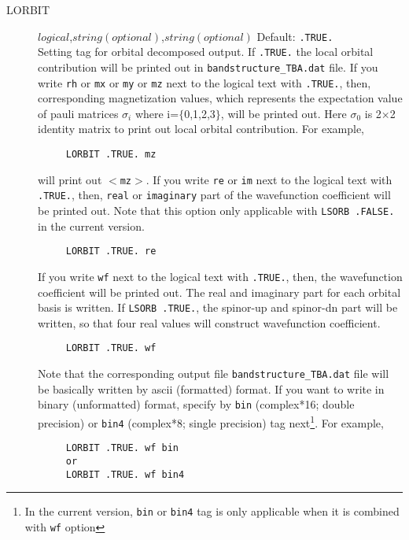 \documentclass[a4paper,12pt]{scrartcl}
\makeatletter
\def\namedlabel#1#2{\begingroup
    #2%
    \def\@currentlabel{#2}%
    \phantomsection\label{#1}\endgroup
}
\makeatother
\begin{document}
\begin{description}
    \item[\namedlabel{tag:LORBIT}{LORBIT}] $logical$,$string (optional)$,$string (optional)$ Default: \texttt{.TRUE.} \\
        Setting tag for orbital decomposed output.
		If \texttt{.TRUE.} the local orbital contribution will be printed out
		in \texttt{bandstructure\_TBA.dat} file.
        If you write \texttt{rh} or \texttt{mx} or \texttt{my} or \texttt{mz} next to the logical text with \texttt{.TRUE.},
        then, corresponding magnetization values, which represents
        the expectation value of pauli matrices $\sigma_{i}$ where i=$\{$0,1,2,3$\}$, 
        will be printed out. Here $\sigma_{0}$ is 2$\times$2 identity 
        matrix to print out local orbital contribution. For example,   
        
    \begin{verbatim}
     LORBIT .TRUE. mz
    \end{verbatim}
    will print out $<$\texttt{mz}$>$.
        If you write \texttt{re} or \texttt{im} next to the logical text with \texttt{.TRUE.}, then, \texttt{real} or \texttt{imaginary} part of the wavefunction coefficient will be printed out. Note that this option only applicable with \texttt{LSORB .FALSE.} in the current version.
    \begin{verbatim}
     LORBIT .TRUE. re
    \end{verbatim}
        If you write \texttt{wf} next to the logical text with \texttt{.TRUE.}, then, the wavefunction coefficient will be printed out. The real and imaginary part for 
        each orbital basis is written. If \texttt{LSORB .TRUE.},
        the spinor-up and spinor-dn part will be written, so that four real values will construct wavefunction coefficient. 
    \begin{verbatim}
     LORBIT .TRUE. wf
    \end{verbatim}

        Note that the corresponding output file \texttt{bandstructure\_TBA.dat} file will be basically 
        written by ascii (formatted) format. If you want to write in binary (unformatted) format,
        specify by \texttt{bin} (complex*16; double precision) or \texttt{bin4} (complex*8; single precision) tag next\footnote{In the current version, \texttt{bin} or \texttt{bin4} tag is only applicable when it is combined with \texttt{wf} option}. For example,

    \begin{verbatim}
     LORBIT .TRUE. wf bin
     or
     LORBIT .TRUE. wf bin4
    \end{verbatim}
    

\end{description}
\end{document}

